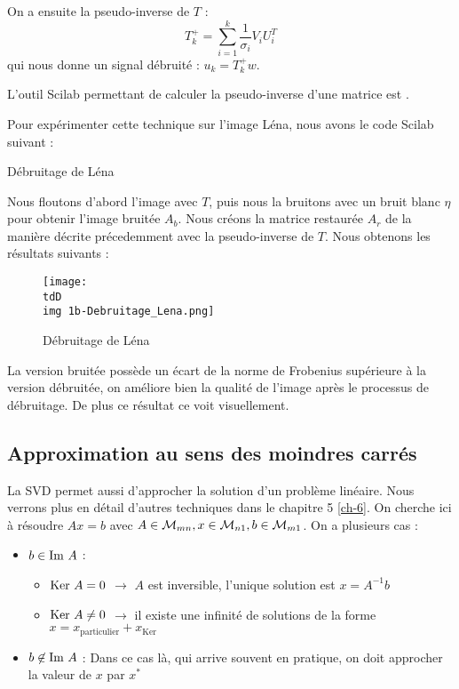 		On a ensuite la pseudo-inverse de $T$ :
		\begin{equation}
			\label{eq-4-pseudoInverse}
			T_k^+ = \sum_{i=1}^k \frac{1}{\sigma_i}V_iU_i^T
		\end{equation}
		qui nous donne un signal débruité : $u_k = T_k^+ w$.

		L'outil Scilab permettant de calculer la pseudo-inverse d'une matrice est .

		Pour expérimenter cette technique sur l'image Léna, nous avons le code Scilab suivant :

		\begin{listing}[H]
			\caption{Débruitage de Léna}
			\label{code-4-debruitageLena}
		\end{listing}

		Nous floutons d'abord l'image avec $T$, puis nous la bruitons avec un bruit blanc $\eta$ pour obtenir l'image bruitée $A_b$. Nous créons la matrice restaurée $A_r$ de la manière décrite précedemment avec la pseudo-inverse de $T$. 
		Nous obtenons les résultats suivants :

		\begin{figure}[H]
			\centering
			\texttt{[image: \\tdD\\img 1b-Debruitage\_Lena.png]}
			\caption{Débruitage de Léna}
			\label{img-4-debruitageLena}
		\end{figure}

		La version bruitée possède un écart de la norme de Frobenius supérieure à la version débruitée, on améliore bien la qualité de l'image après le processus de débruitage. De plus ce résultat ce voit visuellement.



	\subsection{Approximation au sens des moindres carrés}

		La SVD permet aussi d'approcher la solution d'un problème linéaire.
		Nous verrons plus en détail d'autres techniques dans le chapitre 5 \eqref{ch-6}.
		On cherche ici à résoudre $Ax=b$ avec $A\in\mathcal{M}_{mn}, x\in\mathcal{M}_{n1}, b\in\mathcal{M}_{m1}$. On a plusieurs cas :

		\begin{itemize}
			\item $b \in \text{Im~} A$ :
				\begin{itemize}
					\item $\text{Ker~} A = 0$		\quad $\to$ $A$ est inversible, l'unique solution est $x = A^{-1}b$
					\item $\text{Ker~} A \neq 0$	\quad $\to$ il existe une infinité de solutions de la forme $x = x_\text{particulier} + x_\text{Ker}$ 
				\end{itemize}

			\item $b \not\in \text{Im~} A$ : Dans ce cas là, qui arrive souvent en pratique, on doit approcher la valeur de $x$ par $x^*$
		\end{itemize}

